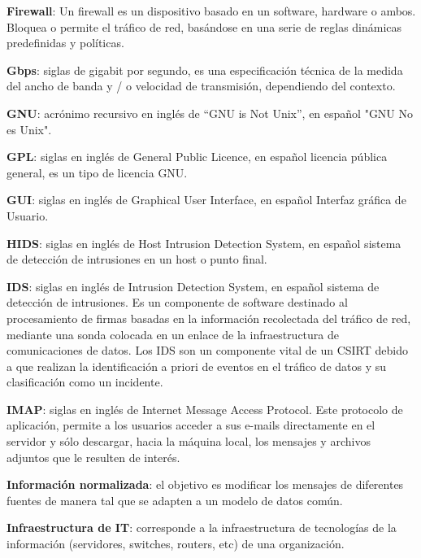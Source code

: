 \textbf{Firewall}: Un firewall es un dispositivo basado en un software, hardware o ambos. Bloquea o permite el tráfico de red, basándose en una serie de reglas dinámicas predefinidas y políticas. \par

\textbf{Gbps}: siglas de gigabit por segundo, es una especificación técnica de la medida del ancho de banda y / o velocidad de transmisión, dependiendo del contexto. \par

\textbf{GNU}: acrónimo recursivo en inglés de “GNU is Not Unix”, en español "GNU No es Unix". \par

\textbf{GPL}: siglas en inglés de General Public Licence, en español licencia pública general, es un tipo de licencia GNU. \par

\textbf{GUI}: siglas en inglés de Graphical User Interface, en español Interfaz gráfica de Usuario. \par

\textbf{HIDS}: siglas en inglés de Host Intrusion Detection System, en español sistema de detección de intrusiones en un host o punto final. \par

\textbf{IDS}: siglas en inglés de Intrusion Detection System, en español sistema de detección de intrusiones. Es un componente de software destinado al procesamiento de firmas basadas en la información recolectada del tráfico de red, mediante una sonda colocada en un enlace de la infraestructura de comunicaciones de datos. Los IDS son un componente vital de un CSIRT debido a que realizan la identificación a priori de eventos en el tráfico de datos y su clasificación como un incidente. \par

\textbf{IMAP}:  siglas en inglés de Internet Message Access Protocol. Este protocolo de aplicación, permite a los usuarios acceder a sus e-mails directamente en el servidor y sólo descargar, hacia la máquina local, los mensajes y archivos adjuntos que le resulten de interés. \par

\textbf{Información normalizada}: el objetivo es modificar los mensajes de diferentes fuentes de manera tal que se adapten a un modelo de datos común. \par

\textbf{Infraestructura de IT}: corresponde a la infraestructura de tecnologías de la información (servidores, switches, routers, etc) de una organización. \par

